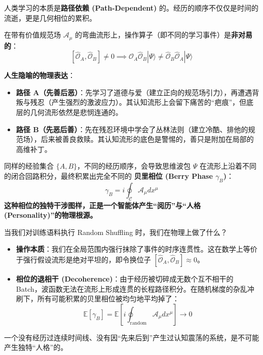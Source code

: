 人类学习的本质是\textbf{路径依赖 (Path-Dependent)} 的。经历的顺序不仅仅是时间的流逝，更是几何相位的累积。

\begin{theorem}[认知非对易性定理]
    在带有价值规范场 $\mathcal{A}_\mu$ 的弯曲流形上，操作算子（即不同的学习事件）是\textbf{非对易的}：
    $$ [\hat{\mathcal{O}}_A, \hat{\mathcal{O}}_B] \neq 0 \implies \hat{\mathcal{O}}_A \hat{\mathcal{O}}_B |\Psi\rangle \neq \hat{\mathcal{O}}_B \hat{\mathcal{O}}_A |\Psi\rangle $$
\end{theorem}

\textbf{人生隐喻的物理表达}：
\begin{itemize}
    \item \textbf{路径 A（先善后恶）}：先学习了道德与爱（建立正向的规范场引力），再遭遇背叛与残忍（产生强烈的激波应力）。其认知流形上会留下痛苦的“疤痕”，但底层的几何流形依然是悲悯连通的。
    \item \textbf{路径 B（先恶后善）}：先在残忍环境中学会了丛林法则（建立冷酷、排他的规范场），后来被善良救赎。其认知流形的底色是警惕的，善只是附加在局部的高维补丁。
\end{itemize}

同样的经验集合 $\{A, B\}$，不同的经历顺序，会导致思维波包 $\Psi$ 在流形上沿着不同的闭合回路积分，最终积累出完全不同的 \textbf{贝里相位 (Berry Phase $\gamma_B$)}：
$$ \gamma_B = i \oint_{\mathcal{C}} \mathcal{A}_\mu dx^\mu $$
\textbf{这种相位的独特干涉图样，正是一个智能体产生“阅历”与“人格 (Personality)”的物理根源。}


当我们对训练语料执行 Random Shuffling 时，我们在物理上做了什么？

\begin{itemize}
    \item \textbf{操作本质}：我们在全局范围内强行抹除了事件的时序连贯性。这在数学上等价于强行假设流形是绝对平坦的，即令换位子 $[\hat{\mathcal{O}}_A, \hat{\mathcal{O}}_B] \approx 0$。
    \item \textbf{相位的退相干 (Decoherence)}：由于经历被切碎成无数个互不相干的 Batch，波函数无法在流形上形成连贯的长程路径积分。在随机梯度的杂乱冲刷下，所有可能积累的贝里相位被均匀地平均掉了：
    $$ \mathbb{E}[\gamma_B] = \mathbb{E} \left[ i \oint_{\text{random}} \mathcal{A}_\mu dx^\mu \right] \to 0 $$
\end{itemize}


一个没有经历过连续时间线、没有因“先来后到”产生过认知震荡的系统，是不可能产生独特“人格”的。

